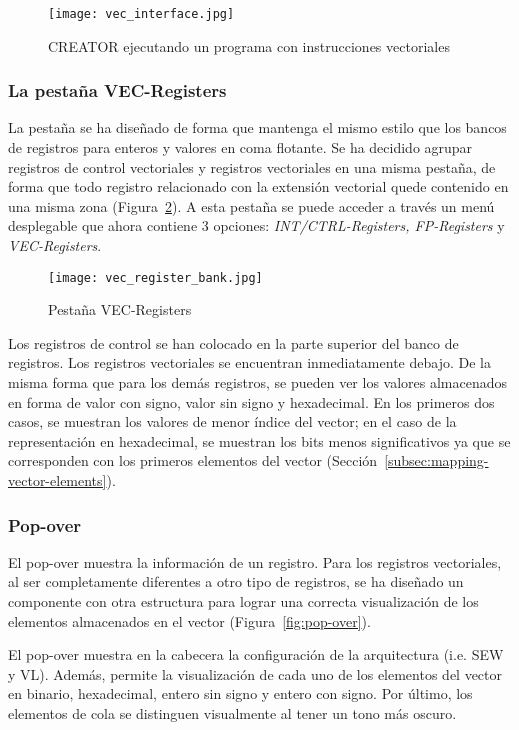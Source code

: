 \begin{figure}[H]
    \texttt{[image: vec\_interface.jpg]}
    \caption{CREATOR ejecutando un programa con instrucciones vectoriales}\label{fig:creator-exec-vec}
\end{figure}

\subsubsection{La pestaña VEC-Registers}
La pestaña se ha diseñado de forma que mantenga el mismo estilo que los bancos de registros para enteros y valores en coma flotante. Se ha decidido agrupar registros de control vectoriales y registros vectoriales en una misma pestaña, de forma que todo registro relacionado con la extensión vectorial quede contenido en una misma zona (Figura~\ref{fig:register-bank}). A esta pestaña se puede acceder a través un menú desplegable que ahora contiene 3 opciones: \textit{INT/CTRL-Registers, FP-Registers} y \textit{VEC-Registers}.

\begin{figure}[H]
    \texttt{[image: vec\_register\_bank.jpg]}
    \caption{Pestaña VEC-Registers}\label{fig:register-bank}
\end{figure}

Los registros de control se han colocado en la parte superior del banco de registros. Los registros vectoriales se encuentran inmediatamente debajo. De la misma forma que para los demás registros, se pueden ver los valores almacenados en forma de valor con signo, valor sin signo y hexadecimal. En los primeros dos casos, se muestran los valores de menor índice del vector; en el caso de la representación en hexadecimal, se muestran los bits menos significativos ya que se corresponden con los primeros elementos del vector (Sección~\ref{subsec:mapping-vector-elements}).

\subsubsection{Pop-over}

El pop-over muestra la información de un registro. Para los registros vectoriales, al ser completamente diferentes a otro tipo de registros, se ha diseñado un componente con otra estructura para lograr una correcta visualización de los elementos almacenados en el vector (Figura~\ref{fig:pop-over}).

El pop-over muestra en la cabecera la configuración de la arquitectura (i.e. SEW y VL). Además, permite la visualización de cada uno de los elementos del vector en binario, hexadecimal, entero sin signo y entero con signo. Por último, los elementos de cola se distinguen visualmente al tener un tono más oscuro.

